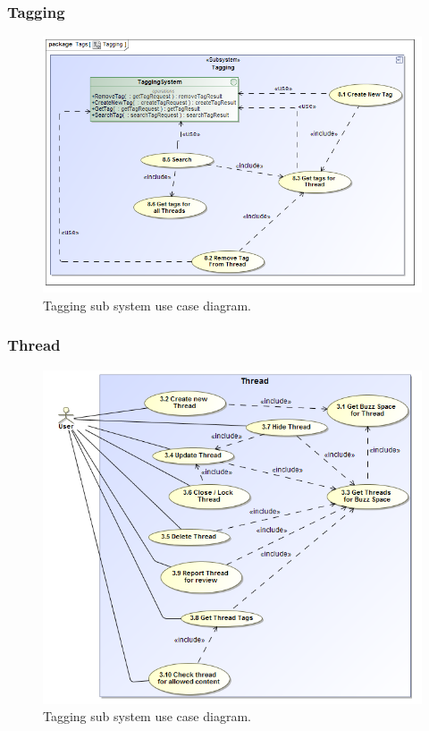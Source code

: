 \documentclass [a4paper,12pt] {article}
\begin{document}
		\subsubsection{Tagging}
			\begin{figure}[H]
				\centering
				\includegraphics[width=1.0\textwidth]{TaggingUC.png}
				\caption{Tagging sub system use case diagram.}
			\end{figure}
		\subsubsection{Thread}
			\begin{figure}[H]
				\centering
				\includegraphics[width=1.0\textwidth]{ThreadUC.png}
				\caption{Tagging sub system use case diagram.}
			\end{figure}	
\end{document}
